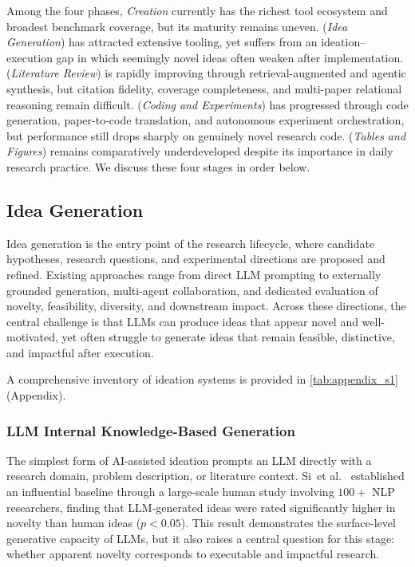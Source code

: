\documentclass{llmxive}
\providecommand{\etal}{et al.\xspace}
\providecommand{\levelbadge}[2]{  \tcbox[on line, nobeforeafter, tcbox raise base,
         boxsep=0pt, left=2pt, right=2pt, top=0.5pt, bottom=0.5pt,
         arc=1.5pt, boxrule=0.3pt,
         colback=#1!15, colframe=#1!70]    {\scriptsize\bfseries\sffamily#2}}
\providecommand{\Sone}{\texorpdfstring{\levelbadge{S1color}{S1}}{S1}\xspace}
\providecommand{\Stwo}{\texorpdfstring{\levelbadge{S2color}{S2}}{S2}\xspace}
\providecommand{\Sthree}{\texorpdfstring{\levelbadge{S3color}{S3}}{S3}\xspace}
\providecommand{\Sfour}{\texorpdfstring{\levelbadge{S4color}{S4}}{S4}\xspace}
\begin{document}
Among the four phases, \emph{Creation} currently has the richest tool ecosystem and broadest benchmark coverage, but its maturity remains uneven. \Sone (\emph{Idea Generation}) has attracted extensive tooling, yet suffers from an ideation--execution gap in which seemingly novel ideas often weaken after implementation. \Stwo (\emph{Literature Review}) is rapidly improving through retrieval-augmented and agentic synthesis, but citation fidelity, coverage completeness, and multi-paper relational reasoning remain difficult. \Sthree (\emph{Coding and Experiments}) has progressed through code generation, paper-to-code translation, and autonomous experiment orchestration, but performance still drops sharply on genuinely novel research code. \Sfour (\emph{Tables and Figures}) remains comparatively underdeveloped despite its importance in daily research practice. We discuss these four stages in order below.



\subsection{Idea Generation}
\label{sec:ideation}

Idea generation is the entry point of the research lifecycle, where candidate hypotheses, research questions, and experimental directions are proposed and refined. Existing approaches range from direct LLM prompting to externally grounded generation, multi-agent collaboration, and dedicated evaluation of novelty, feasibility, diversity, and downstream impact. Across these directions, the central challenge is that LLMs can produce ideas that appear novel and well-motivated, yet often struggle to generate ideas that remain feasible, distinctive, and impactful after execution. 

A comprehensive inventory of ideation systems is provided in \cref{tab:appendix_s1} (Appendix).



\subsubsection{LLM Internal Knowledge-Based Generation}
\label{sec:idea_internal}

The simplest form of AI-assisted ideation prompts an LLM directly with a research domain, problem description, or literature context. Si~\etal~\cite{si2024ideas} established an influential baseline through a large-scale human study involving $100+$ NLP researchers, finding that LLM-generated ideas were rated significantly higher in novelty than human ideas ($p<0.05$). This result demonstrates the surface-level generative capacity of LLMs, but it also raises a central question for this stage: whether apparent novelty corresponds to executable and impactful research.
\end{document}
